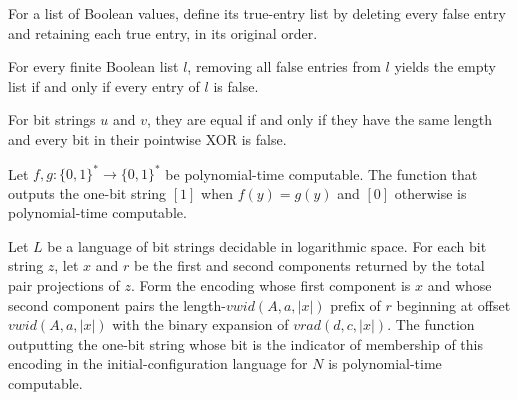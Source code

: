 \begin{definition}
\label{Complexity.TQBFHard.keepTrue}
\leanok
{}
For a list of Boolean values, define its true-entry list by deleting every false entry
and retaining each true entry, in its original order.
\end{definition}

\begin{theorem}
\label{Complexity.TQBFHard.keepTrue_eq_nil_iff}
\leanok
{}
For every finite Boolean list $l$, removing all false entries from $l$ yields the empty
list if and only if every entry of $l$ is false.
\end{theorem}

\begin{theorem}
\label{Complexity.TQBFHard.eq_iff_xor}
\leanok
{}
For bit strings $u$ and $v$, they are equal if and only if they have the same length and
every bit in their pointwise XOR is false.
\end{theorem}

\begin{theorem}
\label{Complexity.TQBFHard.pt_eq}
\leanok
{}
Let $f,g\colon\{0,1\}^*\to\{0,1\}^*$ be polynomial-time computable. The function that
outputs the one-bit string $[1]$ when $f(y)=g(y)$ and $[0]$ otherwise is polynomial-time
computable.
\end{theorem}

\begin{theorem}
\label{Complexity.TQBFHard.pt_indicator}
\leanok
{}
Let $L$ be a language of bit strings decidable in logarithmic space. For each bit string
$z$, let $x$ and $r$ be the first and second components returned by the total pair
projections of $z$. Form the encoding whose first component is $x$ and whose second
component pairs the length-$vwid(A,a,|x|)$ prefix of $r$ beginning at offset
$vwid(A,a,|x|)$ with the binary expansion of $vrad(d,c,|x|)$. The function outputting
the one-bit string whose bit is the indicator of membership of this encoding in the
initial-configuration language for $N$ is polynomial-time computable.
\end{theorem}

